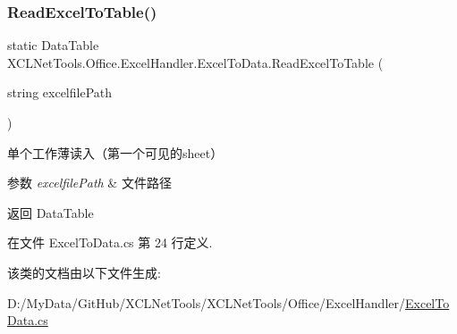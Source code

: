 \subsubsection{\texorpdfstring{Read\+Excel\+To\+Table()}{ReadExcelToTable()}}
{\footnotesize\ttfamily static Data\+Table X\+C\+L\+Net\+Tools.\+Office.\+Excel\+Handler.\+Excel\+To\+Data.\+Read\+Excel\+To\+Table (\begin{DoxyParamCaption}\item[{string}]{excelfile\+Path }\end{DoxyParamCaption})\hspace{0.3cm}{\ttfamily [static]}}



单个工作薄读入（第一个可见的sheet） 
\begin{DoxyParams}{参数}
{\em excelfile\+Path} & 文件路径\\
\hline
\end{DoxyParams}
\begin{DoxyReturn}{返回}
Data\+Table
\end{DoxyReturn}




在文件 Excel\+To\+Data.\+cs 第 24 行定义.



该类的文档由以下文件生成\+:\begin{DoxyCompactItemize}
\item 
D\+:/\+My\+Data/\+Git\+Hub/\+X\+C\+L\+Net\+Tools/\+X\+C\+L\+Net\+Tools/\+Office/\+Excel\+Handler/\hyperlink{_excel_to_data_8cs}{Excel\+To\+Data.\+cs}\end{DoxyCompactItemize}
